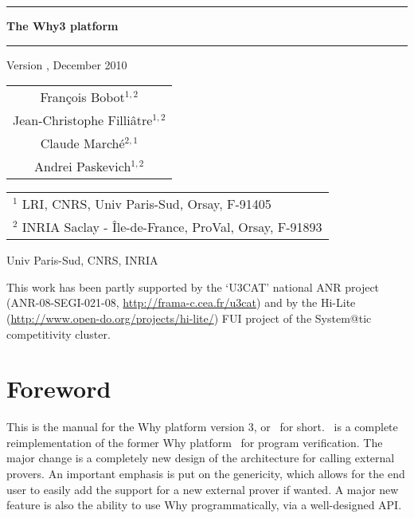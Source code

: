 \documentclass[a4paper,11pt,twoside,openright]{memoir}
\begin{document}
\sloppy
{}

\thispagestyle{empty}

\begin{center}

\rule\textwidth{0.8mm}

\vfill

{\fontsize{40}{40pt}\selectfont\bfseries\sffamily The Why3 platform}

\vfill

\rule\textwidth{0.8mm}

\vfill

\begin{LARGE}
  Version \whyversion{}, December 2010
\end{LARGE}

\vfill

\begin{Large}
  \begin{tabular}{c}
  Fran\c{c}ois Bobot$^{1,2}$ \\
  Jean-Christophe Filli\^atre$^{1,2}$  \\
  Claude March\'e$^{2,1}$ \\
  Andrei Paskevich$^{1,2}$
\end{tabular}
\end{Large}
\vfill

\begin{flushleft}

\begin{tabular}{l}
$^1$ LRI, CNRS, Univ Paris-Sud, Orsay, F-91405 \\
$^2$ INRIA Saclay - \^Ile-de-France, ProVal, Orsay, F-91893
\end{tabular}

\bigskip

   Univ Paris-Sud, CNRS, INRIA

  This work has been partly supported by the `U3CAT' national ANR project
  (ANR-08-SEGI-021-08, \url{http://frama-c.cea.fr/u3cat}) and by the
  Hi-Lite (\url{http://www.open-do.org/projects/hi-lite/}) FUI project of the
  System@tic competitivity cluster.

\end{flushleft}
\end{center}

\chapter*{Foreword}

This is the manual for the Why platform version 3, or \why\ for
short. \why\ is a complete reimplementation of the former Why
platform~\cite{filliatre07cav} for program verification.  The major
change is a completely new design of the architecture for calling
external provers. An important emphasis is put on the genericity,
which allows for the end user to easily add the support for a new
external prover if wanted.  A major new feature is also the ability
to use Why programmatically, via a well-designed API.
\end{document}
